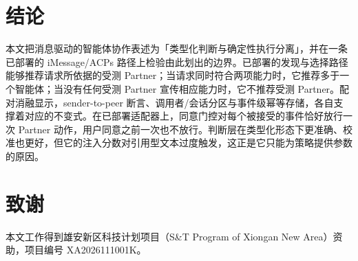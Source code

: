 \documentclass[11pt,a4paper]{article}
\begin{document}
\section{结论}

本文把消息驱动的智能体协作表述为「类型化判断与确定性执行分离」，并在一条已部署的 iMessage/ACPs 路径上检验由此划出的边界。已部署的发现与选择路径能够推荐请求所依据的受测 Partner；当请求同时符合两项能力时，它推荐多于一个智能体；当没有任何受测 Partner 宣传相应能力时，它不推荐受测 Partner。配对消融显示，sender-to-peer 断言、调用者/会话分区与事件级幂等存储，各自支撑着对应的不变式。在已部署适配器上，同意门控对每个被接受的事件恰好放行一次 Partner 动作，用户同意之前一次也不放行。判断层在类型化形态下更准确、校准也更好，但它的注入分数对引用型文本过度触发，这正是它只能为策略提供参数的原因。

\section*{致谢}

本文工作得到雄安新区科技计划项目（S\&T Program of Xiongan New Area）资助，项目编号 XA2026111001K。
\end{document}
